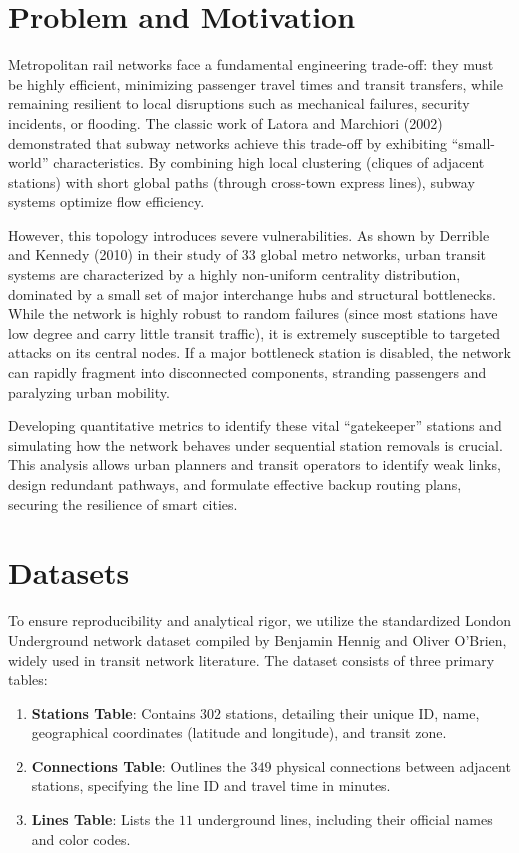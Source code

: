 \documentclass[12pt, a4paper]{article}
\begin{document}
\section{Problem and Motivation}
\label{problem-and-motivation}
Metropolitan rail networks face a fundamental engineering trade-off: they must be highly efficient, minimizing passenger travel times and transit transfers, while remaining resilient to local disruptions such as mechanical failures, security incidents, or flooding. The classic work of Latora and Marchiori (2002) demonstrated that subway networks achieve this trade-off by exhibiting ``small-world'' characteristics. By combining high local clustering (cliques of adjacent stations) with short global paths (through cross-town express lines), subway systems optimize flow efficiency.

However, this topology introduces severe vulnerabilities. As shown by Derrible and Kennedy (2010) in their study of 33 global metro networks, urban transit systems are characterized by a highly non-uniform centrality distribution, dominated by a small set of major interchange hubs and structural bottlenecks. While the network is highly robust to random failures (since most stations have low degree and carry little transit traffic), it is extremely susceptible to targeted attacks on its central nodes. If a major bottleneck station is disabled, the network can rapidly fragment into disconnected components, stranding passengers and paralyzing urban mobility.

Developing quantitative metrics to identify these vital ``gatekeeper'' stations and simulating how the network behaves under sequential station removals is crucial. This analysis allows urban planners and transit operators to identify weak links, design redundant pathways, and formulate effective backup routing plans, securing the resilience of smart cities.

\section{Datasets}
\label{datasets}
To ensure reproducibility and analytical rigor, we utilize the standardized London Underground network dataset compiled by Benjamin Hennig and Oliver O'Brien, widely used in transit network literature. The dataset consists of three primary tables:
\begin{enumerate}
    \item \textbf{Stations Table}: Contains $302$ stations, detailing their unique ID, name, geographical coordinates (latitude and longitude), and transit zone.
    \item \textbf{Connections Table}: Outlines the $349$ physical connections between adjacent stations, specifying the line ID and travel time in minutes.
    \item \textbf{Lines Table}: Lists the $11$ underground lines, including their official names and color codes.
\end{enumerate}
\end{document}
